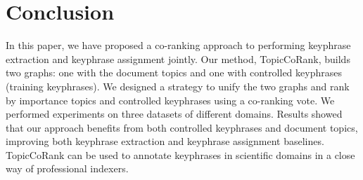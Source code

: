 \section{Conclusion}
\label{sec:conclusion}
     In this paper, we have proposed a co-ranking approach to performing keyphrase
  extraction and keyphrase assignment jointly. Our method,
  TopicCoRank, builds two graphs: one with the
  document topics and one with controlled keyphrases (training keyphrases). We
  designed a strategy to unify the two graphs and rank by importance topics and
  controlled keyphrases using a co-ranking vote.
  We performed experiments on three datasets of different domains.
  Results showed that our approach benefits from both controlled
  keyphrases and document topics, improving both keyphrase extraction and keyphrase assignment
  baselines. TopicCoRank can be used to annotate keyphrases in scientific domains in a close way of professional indexers.
    


